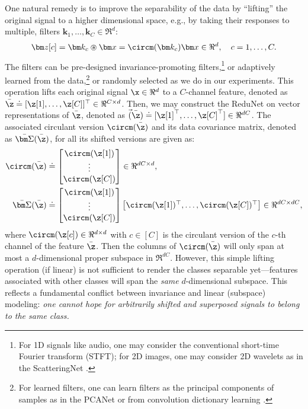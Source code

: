 \documentclass[../../book-main.tex]{subfiles}
\begin{document}
One natural remedy is to improve the separability of the data by
``lifting'' the original signal to a higher dimensional space, e.g.,
by taking their responses to multiple, filters $\bm k_1, \ldots, \bm
k_C \in \Re^d$:
\begin{equation}
    \bm z[c] = \bm k_c \circledast \bm x  =  \circm(\bm k_c) \bm x
    \in \Re^d, \quad c = 1, \ldots, C.
    \label{eqn:lift-1d}
\end{equation}
The filters can be pre-designed invariance-promoting
filters,\footnote{For 1D signals like audio, one may consider the
    conventional short-time Fourier transform (STFT); for 2D images, one
    may consider 2D wavelets as in the ScatteringNet
\cite{scattering-net}.} or adaptively learned from the
data,\footnote{For learned filters, one can learn filters as the
    principal components of samples as in the PCANet
    \cite{chan2015pcanet} or from convolution dictionary learning
\cite{li2019multichannel,qu2019nonconvex}.} or randomly selected as
we do in our experiments. This operation lifts each original signal
$\x \in \Re^d$ to a $C$-channel feature, denoted as $\bar{\z}  \doteq
[\z[1], \ldots, \z[C]]^\top \in \Re^{C\times d}$.
Then, we may construct the ReduNet on vector representations of
$\bar{\z}$, denoted as
$\vec(\bar\z) \doteq [\z[1]^\top, \ldots, \z[C]^\top] \in \Re^{dC}$.
The associated circulant version $ \circm(\bar{\z})$ and its data
covariance matrix, denoted as $\bar{\bm \Sigma}(\bar\z)$, for all its
shifted versions are given as:
\begin{align}
    \circm(\bar{\z}) &\doteq \left[
        \begin{matrix}
            \circm(\z[1])  \\ \vdots \\ \circm(\z[C])
    \end{matrix} \right] \in \Re^{dC\times d},
    \\
    \bar{\bm \Sigma}(\bar\z) &\doteq
    \left[
        \begin{matrix}
            \circm(\z[1]) \\ \vdots \\ \circm(\z[C])
    \end{matrix} \right]\left[
        \begin{matrix}\circm(\z[1])^\top,\ldots, \circm(\z[C])^\top
    \end{matrix} \right] \in \Re^{dC\times dC},
    \label{eqn:W-multichannel}
\end{align}
where $\circm(\z[c]) \in \Re^{d\times d}$ with $c \in [C]$ is the
circulant version of the $c$-th channel of the feature $\bar \z$.
Then the columns of $\circm(\bar\z)$  will only span at most a
$d$-dimensional proper subspace in $\Re^{dC}$.  However, this simple
lifting operation (if linear) is not sufficient to render the classes
separable yet---features associated with other classes will span the
{\em same} $d$-dimensional subspace. This reflects a fundamental
conflict between invariance and linear (subspace) modeling: {\em one
    cannot hope for arbitrarily shifted and superposed signals to belong
to the same class.}
\end{document}
